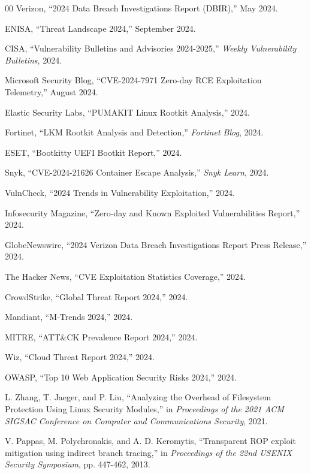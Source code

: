 \documentclass[conference]{IEEEtran}
\begin{document}
\begin{thebibliography}{00}
 Verizon, ``2024 Data Breach Investigations Report (DBIR),'' May 2024.

 ENISA, ``Threat Landscape 2024,'' September 2024.

 CISA, ``Vulnerability Bulletins and Advisories 2024-2025,'' \textit{Weekly Vulnerability Bulletins}, 2024.

 Microsoft Security Blog, ``CVE-2024-7971 Zero-day RCE Exploitation Telemetry,'' August 2024.

 Elastic Security Labs, ``PUMAKIT Linux Rootkit Analysis,'' 2024.

 Fortinet, ``LKM Rootkit Analysis and Detection,'' \textit{Fortinet Blog}, 2024.

 ESET, ``Bootkitty UEFI Bootkit Report,'' 2024.

 Snyk, ``CVE-2024-21626 Container Escape Analysis,'' \textit{Snyk Learn}, 2024.

 VulnCheck, ``2024 Trends in Vulnerability Exploitation,'' 2024.

 Infosecurity Magazine, ``Zero-day and Known Exploited Vulnerabilities Report,'' 2024.

 GlobeNewswire, ``2024 Verizon Data Breach Investigations Report Press Release,'' 2024.

 The Hacker News, ``CVE Exploitation Statistics Coverage,'' 2024.

 CrowdStrike, ``Global Threat Report 2024,'' 2024.

 Mandiant, ``M-Trends 2024,'' 2024.

 MITRE, ``ATT\&CK Prevalence Report 2024,'' 2024.

 Wiz, ``Cloud Threat Report 2024,'' 2024.

 OWASP, ``Top 10 Web Application Security Risks 2024,'' 2024.

 L. Zhang, T. Jaeger, and P. Liu, ``Analyzing the Overhead of Filesystem Protection Using Linux Security Modules,'' in \textit{Proceedings of the 2021 ACM SIGSAC Conference on Computer and Communications Security}, 2021.

 V. Pappas, M. Polychronakis, and A. D. Keromytis, ``Transparent ROP exploit mitigation using indirect branch tracing,'' in \textit{Proceedings of the 22nd USENIX Security Symposium}, pp. 447-462, 2013.


\end{thebibliography}
\end{document}
